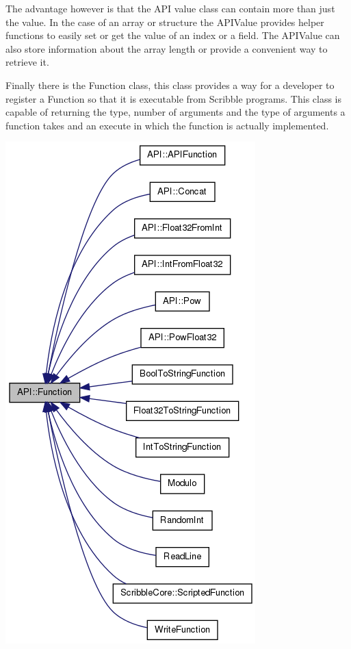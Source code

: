 \documentclass[]{final_report}
\begin{document}
The advantage however is that the API value class can contain more than just the value. In the case of an array or structure the APIValue provides helper functions to easily set or get the value of an index or a field. The APIValue can also store information about the array length or provide a convenient way to retrieve it.

Finally there is the Function class, this class provides a way for a developer to register a Function so that it is executable from Scribble programs. This class is capable of returning the type, number of arguments and the type of arguments a function takes and an execute in which the function is actually implemented.

\begin{center}
\includegraphics[scale=0.6]{"function_class_diagram"}
\end{center}
\end{document}
